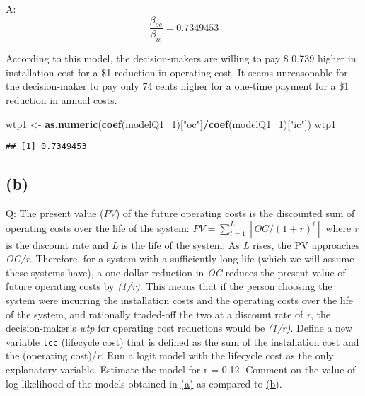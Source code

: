 \documentclass[
]{article}
\newenvironment{Shaded}{\begin{snugshade}}{\end{snugshade}}
\newcommand{\DecValTok}[1]{\textcolor[rgb]{0.00,0.00,0.81}{#1}}
\newcommand{\KeywordTok}[1]{\textcolor[rgb]{0.13,0.29,0.53}{\textbf{#1}}}
\newcommand{\NormalTok}[1]{#1}
\newcommand{\OperatorTok}[1]{\textcolor[rgb]{0.81,0.36,0.00}{\textbf{#1}}}
\newcommand{\StringTok}[1]{\textcolor[rgb]{0.31,0.60,0.02}{#1}}
\begin{document}
A: \begin{equation*}
\frac{\beta_{oc}}{\beta_{ic}}=0.7349453
\end{equation*}

According to this model, the decision-makers are willing to pay \$ 0.739
higher in installation cost for a \$1 reduction in operating cost. It
seems unreasonable for the decision-maker to pay only 74 cents higher
for a one-time payment for a \$1 reduction in annual costs.

\begin{Shaded}
\begin{Highlighting}[]
\NormalTok{wtp1 <-}\StringTok{ }\KeywordTok{as.numeric}\NormalTok{(}\KeywordTok{coef}\NormalTok{(modelQ1_}\DecValTok{1}\NormalTok{)[}\StringTok{"oc"}\NormalTok{]}\OperatorTok{/}\KeywordTok{coef}\NormalTok{(modelQ1_}\DecValTok{1}\NormalTok{)[}\StringTok{"ic"}\NormalTok{])}
\NormalTok{wtp1}
\end{Highlighting}
\end{Shaded}

\begin{verbatim}
## [1] 0.7349453
\end{verbatim}

\hypertarget{oneb}{%
\subsection{(b)}\label{oneb}}

Q: The present value (\(PV\)) of the future operating costs is the
discounted sum of operating costs over the life of the system:
\(PV=\sum_{t=1}^{L}[OC/(1+r)^{t}]\) where \emph{r} is the discount rate
and \emph{L} is the life of the system. As \emph{L} rises, the PV
approaches \emph{OC/r}. Therefore, for a system with a sufficiently long
life (which we will assume these systems have), a one-dollar reduction
in \emph{OC} reduces the present value of future operating costs by
\emph{(1/r)}. This means that if the person choosing the system were
incurring the installation costs and the operating costs over the life
of the system, and rationally traded-off the two at a discount rate of
\emph{r}, the decision-maker's \emph{wtp} for operating cost reductions
would be \emph{(1/r)}. Define a new variable \texttt{lcc} (lifecycle
cost) that is defined as the sum of the installation cost and the
(operating cost)/\emph{r}. Run a logit model with the lifecycle cost as
the only explanatory variable. Estimate the model for r = 0.12. Comment
on the value of log-likelihood of the models obtained in
\protect\hyperlink{onea}{(a)} as compared to
\protect\hyperlink{oneb}{(b)}.
\end{document}
